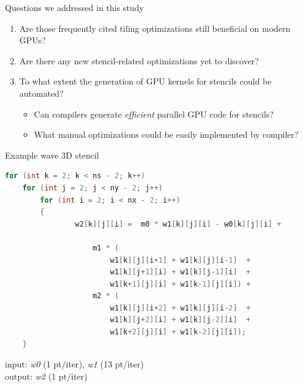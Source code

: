 \documentclass[aspectratio=169]{beamer}
\begin{document}
\begin{frame}[fragile]{Questions we addressed in this study}

\begin{enumerate}
\item Are those frequently cited tiling optimizations still beneficial on modern GPUs?
\item Are there any new stencil-related optimizations yet to discover?
\item To what extent the generation of GPU kernels for stencils could be automated?
\begin{itemize}
\item Can compilers generate \emph{efficient} parallel GPU code for stencils?
\item What manual optimizations could be easily implemented by compiler?
\end{itemize}
\end{enumerate}

\end{frame}



\begin{frame}[fragile]{Example wave 3D stencil}

\begin{lstlisting}[language=c]
for (int k = 2; k < ns - 2; k++)
    for (int j = 2; j < ny - 2; j++)
        for (int i = 2; i < nx - 2; i++)
        {
                w2[k][j][i] =  m0 * w1[k][j][i] - w0[k][j][i] +

                    m1 * (
                        w1[k][j][i+1] + w1[k][j][i-1]  +
                        w1[k][j+1][i] + w1[k][j-1][i]  +
                        w1[k+1][j][i] + w1[k-1][j][i]) +
                    m2 * (
                        w1[k][j][i+2] + w1[k][j][i-2]  +
                        w1[k][j+2][i] + w1[k][j-2][i]  +
                        w1[k+2][j][i] + w1[k-2][j][i]);
	}
\end{lstlisting}

{\small input: \emph{w0} (1 pt/iter), \emph{w1} (13 pt/iter)\\
output: \emph{w2} (1 pt/iter)}

\end{frame}
\end{document}
